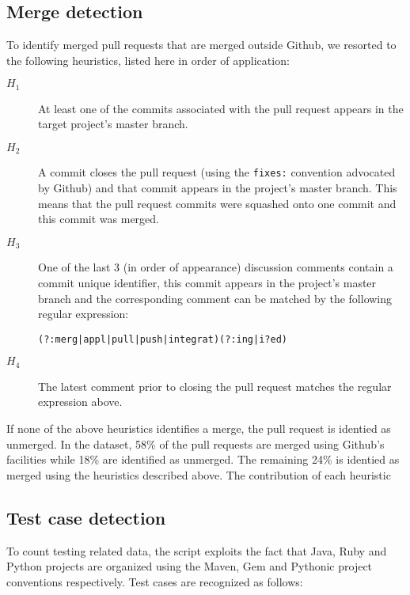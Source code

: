 \documentclass{sig-alternate}
\begin{document}
\subsection{Merge detection}
\label{sec:mergedec}
To identify merged pull requests that are merged outside Github, we resorted to
the following heuristics, listed here in order of application:

\begin{description}

  \item[$H_1$] At least one of the commits associated with the pull request appears in the target project's master branch.

  \item[$H_2$] A commit closes the pull request (using the \texttt{fixes:}
    convention advocated by Github) and that commit appears in the project's
    master branch.  This means that the pull request commits were squashed onto
    one commit and this commit was merged.

  \item[$H_3$] One of the last 3 (in order of appearance) discussion comments contain a
    commit unique identifier, this commit appears in the project's master branch
    and the corresponding comment can be matched by the following regular
    expression:

    \begin{small}
    \texttt{(?:merg|appl|pull|push|integrat)(?:ing|i?ed)}
    \end{small}

  \item[$H_4$] The latest comment prior to closing the pull request matches the
    regular expression above.

\end{description}

If none of the above heuristics identifies a merge, the pull request is
identied as unmerged. In the dataset, 58\% of the pull requests are 
merged using Github's facilities while 18\% are identified as unmerged.
The remaining 24\% is identied as merged using the heuristics described
above. The contribution of each heuristic 

\subsection{Test case detection}

To count testing related data, the script exploits the fact that Java, Ruby and Python projects are organized using the Maven, Gem and Pythonic project conventions respectively. Test cases are recognized as follows:
\end{document}
